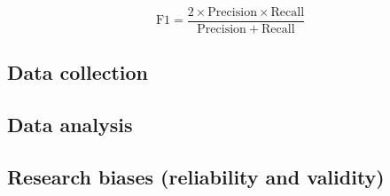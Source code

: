 $$
\mathrm{F1} = \frac{2 \times \mathrm{Precision} \times \mathrm{Recall}}
{\mathrm{Precision} + \mathrm{Recall}}
$$

\subsection{Data collection}
%

\subsection{Data analysis}
%

\subsection{Research biases (reliability and validity)}
%
